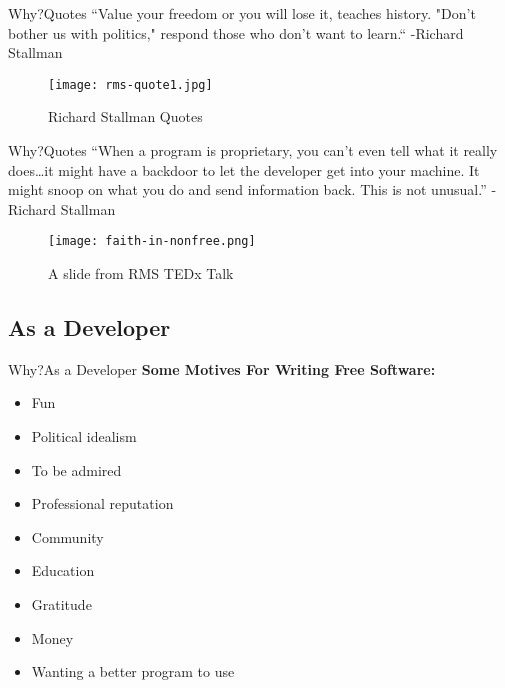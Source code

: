 \documentclass{beamer}
\begin{document}
    \begin{frame}{Why?}{Quotes}
        ``Value your freedom or you will lose it, teaches history. "Don't bother us with politics," respond those who don't want to learn.`` -Richard Stallman\cite{rms-quotes:1}
        \begin{figure}
            \centering
            \texttt{[image: rms-quote1.jpg]}
            \caption{Richard Stallman Quotes\cite{rms-quotes:2}}
        \end{figure}
    \end{frame}
    \begin{frame}{Why?}{Quotes}
        ``When a program is proprietary, you can’t even tell what it really does…it might have a backdoor to let the developer get into your machine. It might snoop
        on what you do and send information back. This is not unusual.'' -Richard Stallman\cite{bretthauer2001open}
        \begin{figure}
            \centering
            \texttt{[image: faith-in-nonfree.png]}
            \caption{A slide from RMS TEDx Talk\cite{rmstedx}}
        \end{figure}
    \end{frame}

        \subsection{As a Developer}
    \begin{frame}{Why?}{As a Developer}
        \textbf{Some Motives For Writing Free Software:}\cite{GNUDOTORG:4}
        \begin{itemize}
            \item Fun
            \item Political idealism
            \item To be admired
            \item Professional reputation
            \item Community
            \item Education
            \item Gratitude
            \item Money
            \item Wanting a better program to use
       \end{itemize}
    \end{frame}
\end{document}
